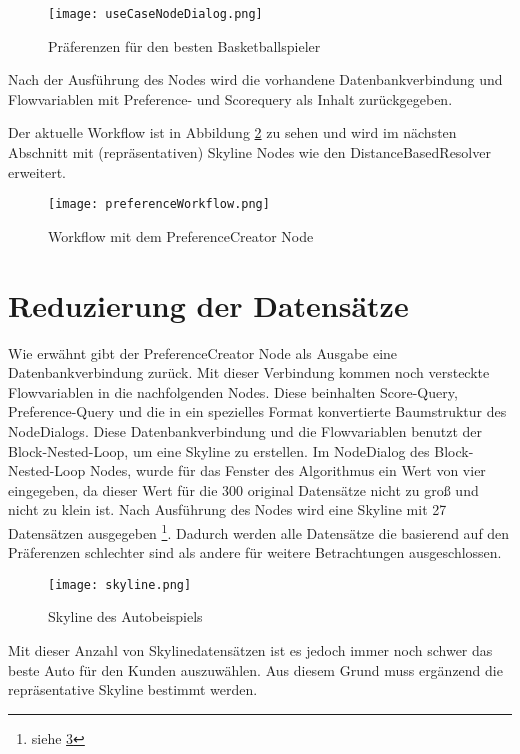 \begin{figure}[H]
	\centering
	\texttt{[image: useCaseNodeDialog.png]}
	\caption{Präferenzen für den besten Basketballspieler}
	\label{img:useCaseNodeDialog}
\end{figure} 

Nach der Ausführung des Nodes wird die vorhandene Datenbankverbindung und Flowvariablen mit Preference- und Scorequery als Inhalt zurückgegeben. 

Der aktuelle Workflow ist in Abbildung \ref{img:preferenceWorkflow} zu sehen und wird im nächsten Abschnitt mit (repräsentativen) Skyline Nodes wie den DistanceBasedResolver erweitert. 

\begin{figure}[H]
	\centering
	\texttt{[image: preferenceWorkflow.png]}
	\caption{Workflow mit dem PreferenceCreator Node}
	\label{img:preferenceWorkflow}
\end{figure}  
\section{Reduzierung der Datensätze}
\label{ch:Evaluierung:sec:repSkyline}
Wie erwähnt gibt der PreferenceCreator Node als Ausgabe eine Datenbankverbindung zurück. Mit dieser Verbindung kommen noch versteckte Flowvariablen in die nachfolgenden Nodes. Diese beinhalten Score-Query, Preference-Query und die in ein spezielles Format konvertierte Baumstruktur des NodeDialogs. Diese Datenbankverbindung und die Flowvariablen benutzt der Block-Nested-Loop, um eine Skyline zu erstellen. Im NodeDialog des Block-Nested-Loop Nodes, wurde für das Fenster des Algorithmus ein Wert von vier eingegeben, da dieser Wert für die 300 original Datensätze  nicht zu groß und nicht zu klein ist. Nach Ausführung des Nodes wird eine Skyline mit 27 Datensätzen ausgegeben \footnote{siehe \ref{img:skyline}}. Dadurch werden alle Datensätze die basierend auf den Präferenzen schlechter sind als andere für weitere Betrachtungen ausgeschlossen.

\begin{figure}[H]
	\centering
	\texttt{[image: skyline.png]}
	\caption{Skyline des Autobeispiels}
	\label{img:skyline}
\end{figure} 

Mit dieser Anzahl von Skylinedatensätzen ist es jedoch immer noch schwer das beste Auto für den Kunden auszuwählen. Aus diesem Grund muss ergänzend die repräsentative Skyline bestimmt werden.

